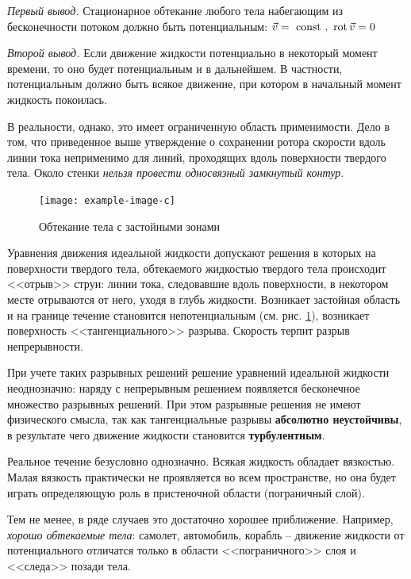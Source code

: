\vspace{0.5em}
\textit{Первый вывод.} Стационарное обтекание любого тела набегающим из бесконечности потоком должно быть потенциальным: $\vec{v} = \text { const }, \,\,\operatorname{rot}\vec{v} = 0$
\vspace{0.5em}

\textit{Второй вывод.} Если движение жидкости потенциально в некоторый момент времени, то оно будет потенциальным и в дальнейшем. В частности, потенциальным должно быть всякое движение, при котором в начальный момент жидкость покоилась. 
\vspace{0.5em}

В реальности, однако, это имеет ограниченную область применимости. Дело в том, что приведенное выше утверждение о сохранении ротора скорости вдоль линии тока неприменимо для линий, проходящих вдоль поверхности твердого тела. Около стенки \textit{нельзя провести односвязный замкнутый контур}. 
\begin{figure}[H]
	\centering
	\texttt{[image: example-image-c]}
	\caption{Обтекание тела с застойными зонами}
	\label{fig:figure14}
\end{figure}
Уравнения движения идеальной жидкости допускают решения в которых на поверхности твердого тела, обтекаемого жидкостью твердого тела происходит <<отрыв>> струи: линии тока, следовавшие вдоль поверхности, в некотором месте отрываются от него, уходя в глубь жидкости. Возникает застойная область и на границе течение становится непотенциальным (см. рис. \ref{fig:figure14}), возникает поверхность <<тангенциального>> разрыва. Скорость терпит разрыв непрерывности.


При учете таких разрывных решений решение уравнений идеальной жидкости неоднозначно: наряду с непрерывным решением появляется бесконечное множество разрывных решений. При этом разрывные решения не имеют физического смысла, так как тангенциальные разрывы \textbf{абсолютно неустойчивы}, в результате чего движение жидкости становится \textbf{турбулентным}.

Реальное течение безусловно однозначно. Всякая жидкость обладает вязкостью. Малая вязкость практически не проявляется во всем пространстве, но она будет играть определяющую роль в пристеночной области (пограничный слой).

Тем не менее, в ряде случаев это достаточно хорошее приближение.  Например, \textit{хорошо обтекаемые тела}: самолет, автомобиль, корабль -- движение жидкости от потенциального отличатся только в области <<пограничного>> слоя и <<следа>> позади тела.

